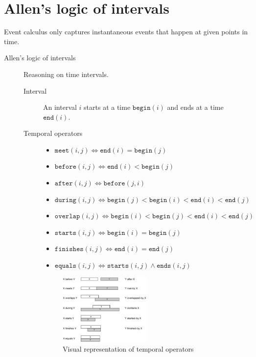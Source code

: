 \section{Allen's logic of intervals}

Event calculus only captures instantaneous events that happen at given points in time.

\begin{description}
    \item[Allen's logic of intervals] 
        Reasoning on time intervals.

        \begin{description}
            \item[Interval]  
                An interval $i$ starts at a time $\texttt{begin}(i)$ and ends at a time $\texttt{end}(i)$.

            \item[Temporal operators] 
                \begin{itemize}
                    \item $\texttt{meet}(i, j) \iff \texttt{end}(i) = \texttt{begin}(j)$
                    \item $\texttt{before}(i, j) \iff \texttt{end}(i) < \texttt{begin}(j)$
                    \item $\texttt{after}(i, j) \iff \texttt{before}(j, i)$
                    \item $\texttt{during}(i, j) \iff \texttt{begin}(j) < \texttt{begin}(i) < \texttt{end}(i) < \texttt{end}(j)$
                    \item $\texttt{overlap}(i, j) \iff \texttt{begin}(i) < \texttt{begin}(j) < \texttt{end}(i) < \texttt{end}(j)$
                    \item $\texttt{starts}(i, j) \iff \texttt{begin}(i) = \texttt{begin}(j)$
                    \item $\texttt{finishes}(i, j) \iff \texttt{end}(i) = \texttt{end}(j)$
                    \item $\texttt{equals}(i, j) \iff \texttt{starts}(i, j) \land \texttt{ends}(i, j)$
                \end{itemize}

                \begin{figure}[H]
                    \centering
                    \includegraphics[width=0.5\textwidth]{img/allen_intervals.png}
                    \caption{Visual representation of temporal operators}
                \end{figure}
        \end{description}
\end{description}
